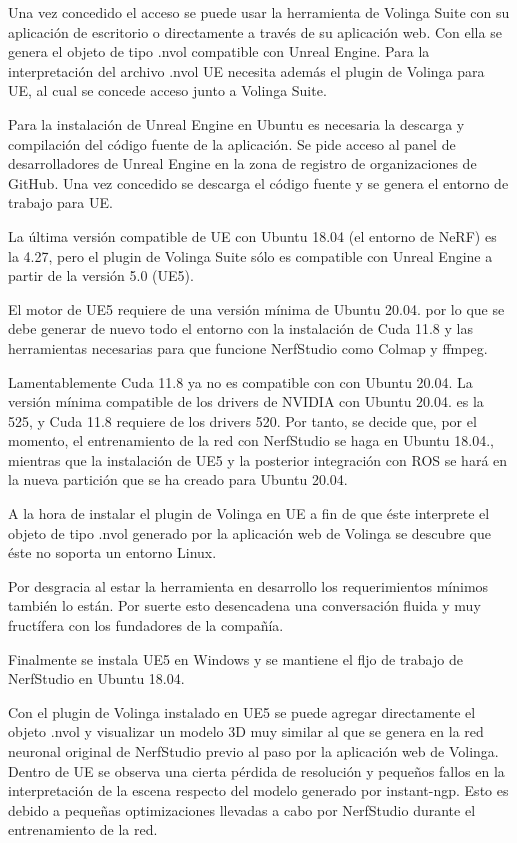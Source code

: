 \documentclass[a4paper, 12pt, spanish, twoside]{article}
\begin{document}
Una vez concedido el acceso se puede usar la herramienta de Volinga Suite con su aplicación de escritorio o directamente a través de su aplicación web. Con ella se genera el objeto de tipo .nvol compatible con Unreal Engine. Para la interpretación del archivo .nvol UE necesita además el plugin de Volinga para UE, al cual se concede acceso junto a Volinga Suite. 

Para la instalación de Unreal Engine en Ubuntu es necesaria la descarga y compilación del código fuente de la aplicación. Se pide acceso al panel de desarrolladores de Unreal Engine en la zona de registro de organizaciones de GitHub. Una vez concedido se descarga el código fuente y se genera el entorno de trabajo para UE. 

La última versión compatible de UE con Ubuntu 18.04 (el entorno de NeRF) es la 4.27, pero el plugin de Volinga Suite sólo es compatible con Unreal Engine a partir de la versión 5.0 (UE5). 

El motor de UE5 requiere de una versión mínima de Ubuntu 20.04. por lo que se debe generar de nuevo todo el entorno con la instalación de Cuda 11.8 y las herramientas necesarias para que funcione NerfStudio como Colmap y ffmpeg. 

Lamentablemente Cuda 11.8 ya no es compatible con con Ubuntu 20.04. La versión mínima compatible de los drivers de NVIDIA con Ubuntu 20.04. es la 525, y Cuda 11.8 requiere de los drivers 520. Por tanto, se decide que, por el momento, el entrenamiento de la red con NerfStudio se haga en Ubuntu 18.04., mientras que la instalación de UE5 y la posterior integración con ROS se hará en la nueva partición que se ha creado para Ubuntu 20.04. 

A la hora de instalar el plugin de Volinga en UE a fin de que éste interprete el objeto de tipo .nvol generado por la aplicación web de Volinga se descubre que éste no soporta un entorno Linux.  

Por desgracia al estar la herramienta en desarrollo los requerimientos mínimos también lo están. Por suerte esto desencadena una conversación fluida y muy fructífera con los fundadores de la compañía. 

Finalmente se instala UE5 en Windows y se mantiene el fljo de trabajo de NerfStudio en Ubuntu 18.04. 

Con el plugin de Volinga instalado en UE5 se puede agregar directamente el objeto .nvol y visualizar un modelo 3D muy similar al que se genera en la red neuronal original de NerfStudio previo al paso por la aplicación web de Volinga. Dentro de UE se observa una cierta pérdida de resolución y pequeños fallos en la interpretación de la escena respecto del modelo generado por instant-ngp. Esto es debido a pequeñas optimizaciones llevadas a cabo por NerfStudio durante el entrenamiento de la red.  
\end{document}
